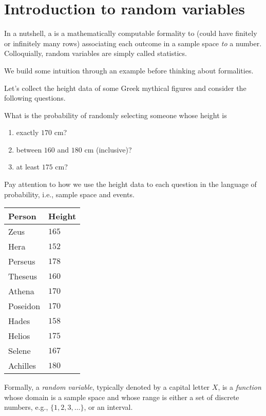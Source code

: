 \documentclass[../main.tex]{subfiles}
\begin{document}
 \section{Introduction to random variables}

In a nutshell, a  is a mathematically computable formality to  (could have finitely or infinitely many rows) associating each outcome in a sample space \emph{to} a number.  Colloquially, random variables are simply called statistics.

We build some intuition through an example before thinking about formalities. 

\begin{example} \label{ex:random-variable-intro}
  Let's collect the height data of some Greek mythical figures and consider the following questions. 

  {\color{main}
    What is the probability of randomly selecting someone whose height is 
    \begin{enumerate}
      \item exactly \(170\) cm?
      \item between \(160\) and \(180\) cm (inclusive)?
      \item at least \(175\) cm?
    \end{enumerate}
  }
  Pay attention to how we use the height data to  each question in the language of probability, i.e., sample space and events. 

  \hfill{}
  \begin{tabular}{l|l}
    Person & Height \\\midrule
    Zeus & \(165\) \\
    Hera & \(152\) \\
    Perseus & \(178\) \\
    Theseus & \(160\) \\
    Athena & \(170\) \\
    Poseidon  & \(170\) \\
    Hades & \(158\) \\
    Helios & \(175\) \\
    Selene & \(167\) \\
    Achilles & \(180\)
  \end{tabular}

\end{example}
\clearpage

Formally, a \emph{random variable}, typically denoted by a capital letter \(X\), is a \emph{function} whose domain is a sample space and whose range is either a set of discrete numbers, e.g., \(\{1,2,3,\ldots\}\), or an interval. 
\end{document}
